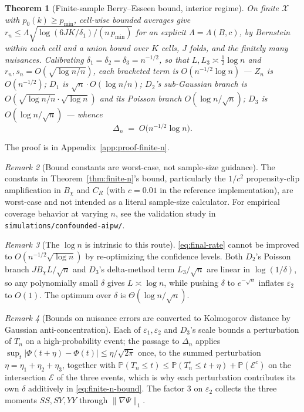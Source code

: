 \documentclass[11pt]{article}
\theoremstyle{plain}
\newtheorem{theorem}{Theorem}[section]
\theoremstyle{definition}
\theoremstyle{remark}
\newtheorem{remark}[theorem]{Remark}
\newcommand{\PP}{\mathbb{P}}
\newcommand{\cX}{\mathcal{X}}
\begin{document}
\begin{theorem}[Finite-sample Berry--Esseen bound, interior regime]
On finite $\cX$ with $p_0(k)\ge p_{\min}$, cell-wise bounded averages give
$r_n\le\Lambda\sqrt{\log(6JK/\delta_1)/(n\,p_{\min})}$ for an explicit
$\Lambda=\Lambda(B,c)$, by Bernstein within each cell and a union bound over $K$ cells,
$J$ folds, and the finitely many nuisances. Calibrating $\delta_1=\delta_2=\delta_3=n^{-1/2}$,
so that $L,L_3\asymp\tfrac12\log n$ and $r_n,s_n=O(\sqrt{\log n/n})$, each bracketed term
is $O(n^{-1/2}\log n)$ --- $Z_n$ is $O(n^{-1/2})$; $D_1$ is $\sqrt n\cdot O(\log n/n)$;
$D_2$'s sub-Gaussian branch is $O(\sqrt{\log n/n}\cdot\sqrt{\log n})$ and its Poisson
branch $O(\log n/\sqrt n)$; $D_3$ is $O(\log n/\sqrt n)$ --- whence
\begin{equation}\label{eq:final-rate}
    \Delta_n\;=\;O\big(n^{-1/2}\log n\big).
\end{equation}
\end{theorem}

The proof is in Appendix~\ref{app:proof-finite-n}.

\begin{remark}[Bound constants are worst-case, not sample-size guidance]\label{rem:finite-n-constants}
The constants in Theorem~\ref{thm:finite-n}'s bound, particularly the $1/c^2$ propensity-clip amplification in $B_\chi$ and $C_R$ (with $c=0.01$ in the reference implementation), are worst-case and not intended as a literal sample-size calculator. For empirical coverage behavior at varying $n$, see the validation study in \texttt{simulations/confounded-aipw/}.
\end{remark}

\begin{remark}[The $\log n$ is intrinsic to this route]\label{rem:log-intrinsic}
\eqref{eq:final-rate} cannot be improved to $O(n^{-1/2}\sqrt{\log n})$ by re-optimizing
the confidence levels. Both $D_2$'s Poisson branch $JB_\chi L/\sqrt n$ and $D_3$'s
delta-method term $L_3/\sqrt n$ are linear in $\log(1/\delta)$, so any polynomially small
$\delta$ gives $L\asymp\log n$, while pushing $\delta$ to $e^{-\sqrt n}$ inflates
$\varepsilon_2$ to $O(1)$. The optimum over $\delta$ is $\Theta(\log n/\sqrt n)$.
\end{remark}

\begin{remark}[Bounds on nuisance errors are converted to Kolmogorov distance by
Gaussian anti-concentration]\label{rem:anticoncentration}
Each of $\varepsilon_1,\varepsilon_2$ and $D_3$'s scale bounds a perturbation of
$T_n$ on a high-probability event; the passage to $\Delta_n$ applies
$\sup_t|\Phi(t+\eta)-\Phi(t)|\le\eta/\sqrt{2\pi}$ once, to the summed perturbation
$\eta=\eta_1+\eta_2+\eta_3$, together with
$\PP(T_n\le t)\le\PP(T_n^\circ\le t+\eta)+\PP(\mathcal E^c)$ on the intersection
$\mathcal E$ of the three events, which is why each
perturbation contributes its own $\delta$ additively in \eqref{eq:finite-n-bound}. The
factor $3$ on $\varepsilon_2$ collects the three moments $SS,SY,YY$ through
$\|\nabla\Psi\|_1$.
\end{remark}
\end{document}
